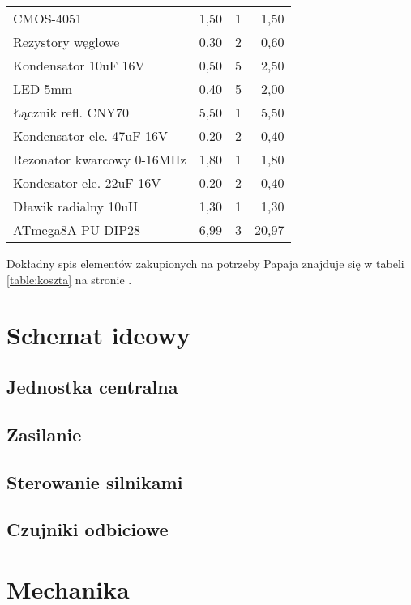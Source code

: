 \documentclass{article}
\begin{document}
\begin{table}[c]
\begin{tabular}{l|r|r|r}
CMOS-4051                     & 1,50        & 1     & 1,50         \\
Rezystory węglowe             & 0,30        & 2     & 0,60         \\
Kondensator 10uF 16V          & 0,50        & 5     & 2,50         \\
LED 5mm                       & 0,40        & 5     & 2,00         \\
Łącznik refl. CNY70           & 5,50        & 1     & 5,50         \\
Kondensator ele. 47uF 16V     & 0,20        & 2     & 0,40         \\
Rezonator kwarcowy 0-16MHz    & 1,80        & 1     & 1,80         \\
Kondesator ele. 22uF 16V      & 0,20        & 2     & 0,40         \\
Dławik radialny 10uH          & 1,30        & 1     & 1,30         \\
ATmega8A-PU DIP28             & 6,99        & 3     & 20,97        
\end{tabular}
\end{table}


Dokładny spis elementów zakupionych na potrzeby Papaja znajduje się w tabeli \ref{table:koszta} na stronie \pageref{table:koszta}.

\section{Schemat ideowy}

\subsection{Jednostka centralna}

\subsection{Zasilanie}

\subsection{Sterowanie silnikami}

\subsection{Czujniki odbiciowe}

\section{Mechanika}
\end{document}
